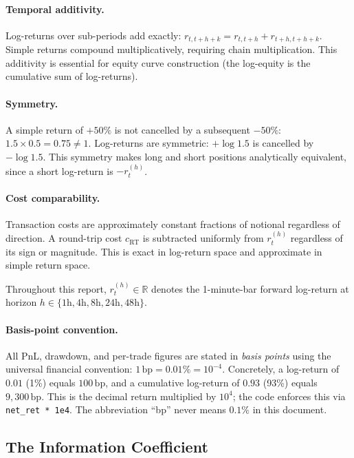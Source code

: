 \documentclass[12pt, a4paper]{article}
\theoremstyle{plain}
\theoremstyle{definition}
\newcommand{\bp}{\,\mathrm{bp}}
\begin{document}
\paragraph{Temporal additivity.}
Log-returns over sub-periods add exactly:
$r_{t,t+h+k} = r_{t,t+h} + r_{t+h,t+h+k}$.
Simple returns compound multiplicatively, requiring chain multiplication.
This additivity is essential for equity curve construction
(the log-equity is the cumulative sum of log-returns).

\paragraph{Symmetry.}
A simple return of $+50\%$ is not cancelled by a subsequent $-50\%$:
$1.5 \times 0.5 = 0.75 \neq 1$. Log-returns are symmetric: $+\log 1.5$
is cancelled by $-\log 1.5$. This symmetry makes long and short positions
analytically equivalent, since a short log-return is $-r_t^{(h)}$.

\paragraph{Cost comparability.}
Transaction costs are approximately constant fractions of notional regardless
of direction. A round-trip cost $c_{\text{RT}}$ is subtracted uniformly from
$r_t^{(h)}$ regardless of its sign or magnitude. This is exact in log-return
space and approximate in simple return space.

Throughout this report, $r_t^{(h)} \in \mathbb{R}$ denotes the 1-minute-bar
forward log-return at horizon $h \in \{1\text{h}, 4\text{h}, 8\text{h},
24\text{h}, 48\text{h}\}$.

\paragraph{Basis-point convention.}
All PnL, drawdown, and per-trade figures are stated in \emph{basis points}
using the universal financial convention: $1\bp = 0.01\% = 10^{-4}$.
Concretely, a log-return of $0.01$ (1\%) equals $100\bp$, and a
cumulative log-return of $0.93$ (93\%) equals $9{,}300\bp$.
This is the decimal return multiplied by $10^{4}$; the code enforces
this via \texttt{net\_ret * 1e4}.
The abbreviation ``bp'' never means $0.1\%$ in this document.

\subsection{The Information Coefficient}
\label{sec:IC}
\end{document}
